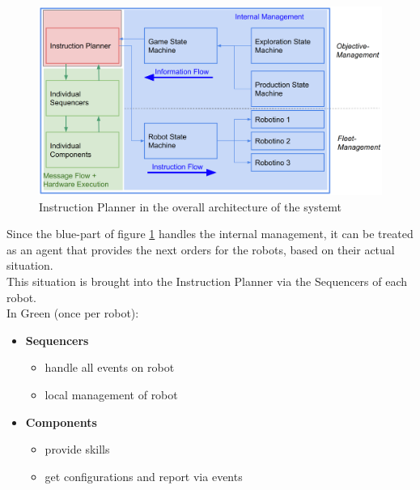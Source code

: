 
\begin{figure}[h]
\centering
\includegraphics[scale=0.4]{pic/Instructionplanner2018.png}
\caption{Instruction Planner in the overall architecture of the systemt}
\label{fig:instr_overview}
\end{figure}
\newpage

Since the blue-part of figure \ref{fig:instr_overview} handles the internal management, it can be treated as an agent that provides the next orders for the robots, based on their actual situation.\\
This situation is brought into the Instruction Planner via the Sequencers of each
robot.\\
In Green (once per robot): \\
\begin{itemize}
    \item \textbf{Sequencers}
    \begin{itemize}
        \item handle all events on robot
        \item local management of robot
    \end{itemize}
    \item \textbf{Components}
    \begin{itemize}
        \item provide skills
        \item get configurations and report via events
    \end{itemize}
\end{itemize}


